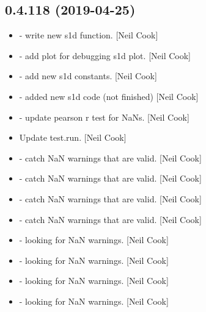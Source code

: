 \documentclass[a4paper,10pt,english]{report}
\begin{document}
\subsection{0.4.118 (2019-04-25)}
\label{\detokenize{misc/changelog:id143}}\begin{itemize}
\item {} 
 - write new s1d function. {[}Neil Cook{]}

\item {} 
 - add  plot for debugging s1d
plot. {[}Neil Cook{]}

\item {} 
 - add new s1d constants. {[}Neil Cook{]}

\item {} 
 - added new s1d code (not finished) {[}Neil
Cook{]}

\item {} 
 - update pearson r test for NaNs. {[}Neil Cook{]}

\item {} 
Update test.run. {[}Neil Cook{]}

\item {} 
 - catch NaN warnings that are valid. {[}Neil Cook{]}

\item {} 
 - catch NaN warnings that are valid. {[}Neil Cook{]}

\item {} 
 - catch NaN warnings that are valid. {[}Neil Cook{]}

\item {} 
 - catch NaN warnings that are valid. {[}Neil Cook{]}

\item {} 
 - looking for NaN warnings. {[}Neil Cook{]}

\item {} 
 - looking for NaN warnings. {[}Neil Cook{]}

\item {} 
 - looking for NaN warnings. {[}Neil Cook{]}

\item {} 
 - looking for NaN warnings. {[}Neil Cook{]}


\end{itemize}
\end{document}
